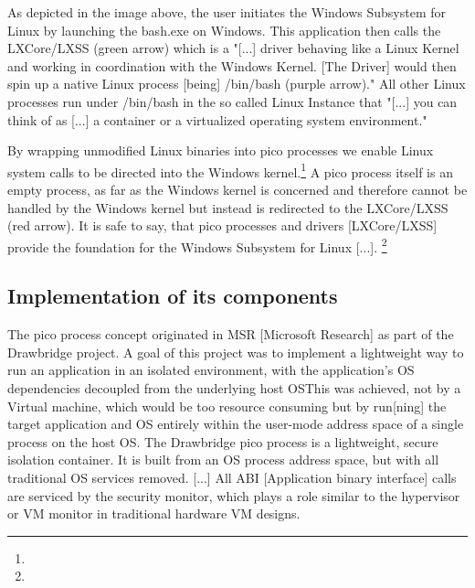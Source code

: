 \documentclass[utf8,biblatex, ngerman, english]{lni}
\begin{document}


As depicted in the image above, the user initiates the Windows Subsystem for Linux by launching the bash.exe on Windows. This application then calls the LXCore/LXSS (green arrow) which is a "[...] driver behaving like a Linux Kernel and working in coordination with the Windows Kernel. [The Driver] would then spin up a native Linux process [being] /bin/bash (purple arrow)."\cite{PP16} All other Linux processes run under /bin/bash in the so called Linux Instance that "[...] you can think of as [...] a container or a virtualized operating system environment." \cite{PP16}

\glqq By wrapping unmodified Linux binaries into pico processes we enable Linux system calls to be directed into the Windows kernel.\grqq \footnote{} A pico process itself is an empty process, as far as the Windows kernel is concerned and therefore cannot be handled by the Windows kernel but instead is redirected to the LXCore/LXSS (red arrow).\cite{PP16}
It is safe to say, that \glqq pico processes and drivers [LXCore/LXSS] provide the foundation for the Windows Subsystem for Linux [...]. \grqq \footnote{}

\subsection{Implementation of its components}

\glqq The pico process concept originated in MSR [Microsoft Research] as part of the Drawbridge project. A goal of this project was to implement a lightweight way to run an application in an isolated environment, with the application’s OS dependencies decoupled from the underlying host OS\glqq \cite{PP16}This was achieved, not by a Virtual machine, which would be too resource consuming but by \glqq run[ning] the target application and OS entirely within the user-mode address space of a single process on the host OS. \glqq \cite{PP16} \glqq The Drawbridge pico process is a lightweight, secure isolation container. It is built from an OS process address space, but with all traditional OS services removed. [...] All ABI [Application binary interface] calls are serviced by the security monitor, which plays a role similar to the hypervisor or VM monitor in traditional hardware VM designs.\glqq \cite{Db11}
\end{document}
